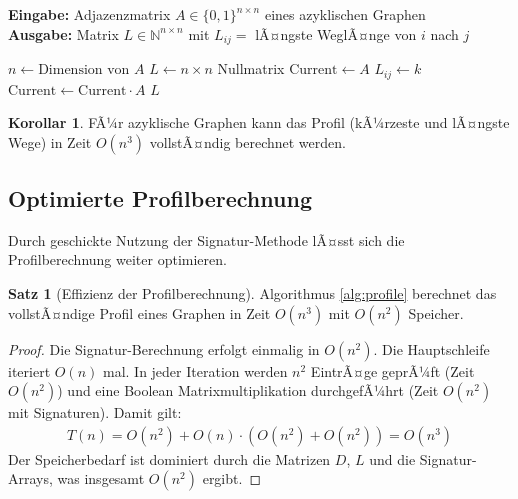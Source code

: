 ﻿\documentclass[a4paper,12pt]{article}
\theoremstyle{definition}
\newtheorem{satz}{Satz}
\newtheorem{korollar}{Korollar}
\begin{document}
	\begin{algorithm}[htb]
		\caption{LÃ¤ngste Wege in azyklischen Graphen}
		\label{alg:longest-paths}
		\textbf{Eingabe:} Adjazenzmatrix $A \in \{0,1\}^{n \times n}$ eines azyklischen Graphen \\
		\textbf{Ausgabe:} Matrix $L \in \mathbb{N}^{n \times n}$ mit $L_{ij} = $ lÃ¤ngste WeglÃ¤nge von $i$ nach $j$
		\begin{algorithmic}[1]
			\State $n \gets \text{Dimension von } A$
			\State $L \gets n \times n$ Nullmatrix
			\State $\text{Current} \gets A$
			\State $L_{ij} \gets k$ 
			\EndIf
			\EndFor
			\EndFor
			\State $\text{Current} \gets \text{Current} \cdot A$ 
			\EndFor
			\State \Return $L$
		\end{algorithmic}
	\end{algorithm}
	
	\begin{korollar}
		FÃ¼r azyklische Graphen kann das Profil (kÃ¼rzeste und lÃ¤ngste Wege) in Zeit $O(n^3)$ vollstÃ¤ndig berechnet werden.
	\end{korollar}
	
	\subsection{Optimierte Profilberechnung}
	Durch geschickte Nutzung der Signatur-Methode lÃ¤sst sich die Profilberechnung weiter optimieren.
	
	\begin{satz}[Effizienz der Profilberechnung]
		Algorithmus \ref{alg:profile} berechnet das vollstÃ¤ndige Profil eines Graphen in Zeit $O(n^3)$ mit $O(n^2)$ Speicher.
	\end{satz}
	
	\begin{proof}
		Die Signatur-Berechnung erfolgt einmalig in $O(n^2)$. Die Hauptschleife iteriert $O(n)$ mal. In jeder Iteration werden $n^2$ EintrÃ¤ge geprÃ¼ft (Zeit $O(n^2)$) und eine Boolean Matrixmultiplikation durchgefÃ¼hrt (Zeit $O(n^2)$ mit Signaturen). Damit gilt:
		\begin{align}
			T(n) = O(n^2) + O(n) \cdot (O(n^2) + O(n^2)) = O(n^3)
		\end{align}
		Der Speicherbedarf ist dominiert durch die Matrizen $D$, $L$ und die Signatur-Arrays, was insgesamt $O(n^2)$ ergibt.
	\end{proof}
	
\end{document}
